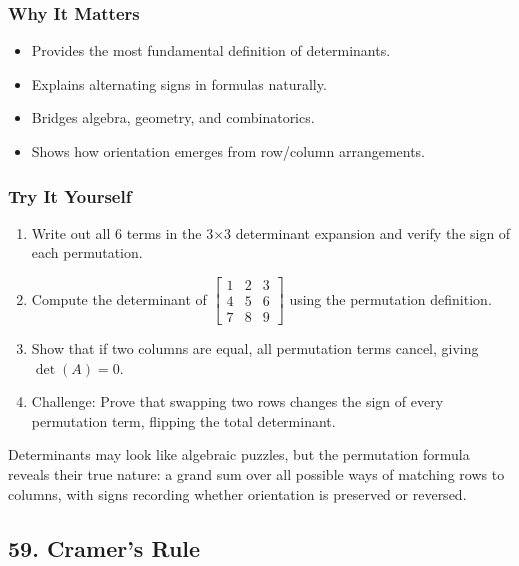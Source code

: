 \documentclass[
  letterpaper,
  DIV=11,
  numbers=noendperiod]{scrreprt}
\providecommand{\tightlist}{%
  \setlength{\itemsep}{0pt}\setlength{\parskip}{0pt}}
\begin{document}
\subsubsection{Why It Matters}\label{why-it-matters-54}

\begin{itemize}
\tightlist
\item
  Provides the most fundamental definition of determinants.
\item
  Explains alternating signs in formulas naturally.
\item
  Bridges algebra, geometry, and combinatorics.
\item
  Shows how orientation emerges from row/column arrangements.
\end{itemize}

\subsubsection{Try It Yourself}\label{try-it-yourself-57}

\begin{enumerate}
\def\labelenumi{\arabic{enumi}.}
\tightlist
\item
  Write out all 6 terms in the 3×3 determinant expansion and verify the
  sign of each permutation.
\item
  Compute the determinant of
  \(\begin{bmatrix} 1 & 2 & 3 \\ 4 & 5 & 6 \\ 7 & 8 & 9 \end{bmatrix}\)
  using the permutation definition.
\item
  Show that if two columns are equal, all permutation terms cancel,
  giving \(\det(A)=0\).
\item
  Challenge: Prove that swapping two rows changes the sign of every
  permutation term, flipping the total determinant.
\end{enumerate}

Determinants may look like algebraic puzzles, but the permutation
formula reveals their true nature: a grand sum over all possible ways of
matching rows to columns, with signs recording whether orientation is
preserved or reversed.

\subsection{59. Cramer's Rule}\label{cramers-rule}
\end{document}
